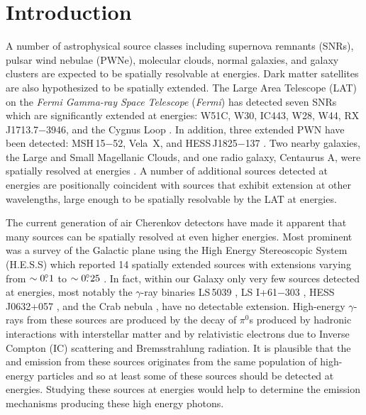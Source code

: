 \documentclass[12pt,preprint]{aastex}
\newcommand{\gev}{\text{GeV}\xspace}
\newcommand{\tev}{\text{TeV}\xspace}
\newcommand{\fermi}{\textit{Fermi}\xspace}
\begin{document}
\section{Introduction}

A number of astrophysical source classes including supernova remnants
(SNRs), pulsar wind nebulae (PWNe), molecular clouds, normal galaxies,
and galaxy clusters are expected to be spatially resolvable at
\gev energies.  Dark matter satellites are also hypothesized to
be spatially extended.  The Large Area Telescope
(LAT) on the {\em \fermi Gamma-ray Space Telescope} (\fermi) has
detected seven SNRs which are significantly extended
at \gev energies: 
W51C, W30, 
IC443, W28, W44, RX\,J1713.7$-$3946,
and the Cygnus Loop
\citep{w51c,w30_lat,ic443,w28,w44,rx_j1713_lat,cygnus_loop_lat}. In addition, 
three extended PWN have been detected: MSH\,15$-$52, Vela~X, and
HESS\,J1825$-$137 \citep{msh1552,velax,fermi_hess_j1825}. Two
nearby galaxies, the Large and Small Magellanic Clouds, and one
radio galaxy, Centaurus A, were spatially resolved at \gev energies
\citep{lmc,smc,cen_a_lat}.  A number of additional sources detected
at \gev energies are positionally coincident with sources that exhibit
extension at other wavelengths, large enough to be spatially
resolvable by the LAT at \gev energies.

The current generation of air Cherenkov detectors have
made it apparent that many sources can be spatially resolved
at even higher energies.
Most
prominent was a survey of the Galactic plane using the High Energy
Stereoscopic System (H.E.S.S) which reported 14 spatially extended
sources with extensions varying from $\sim0\mbox{$.\!\!^\circ$}1$ to $\sim0\mbox{$.\!\!^\circ$}25$
\citep{hess_plane_survey}.  In fact, within our Galaxy only very few
sources detected at \tev energies, most notably the $\gamma$-ray binaries
LS\,5039 \citep{HESSLS5039}, LS I+61$-$303 \citep{MAGICLSI, VERITASLSI},
HESS\,J0632+057 \citep{HESS0632}, and the Crab nebula \citep{crab_weekes},
have no detectable extension.  High-energy $\gamma$-rays from
these sources are produced by the decay of $\pi^0$s produced by hadronic
interactions with interstellar matter and by relativistic electrons
due to Inverse Compton (IC) scattering and Bremsstrahlung radiation.  
It is plausible that the \gev and
\tev emission from these sources originates from the same population of
high-energy particles and so at least some of these sources should be
detected at \gev energies.  Studying 
these \tev sources at \gev energies would help to
determine the emission mechanisms producing these high energy photons.
\end{document}
